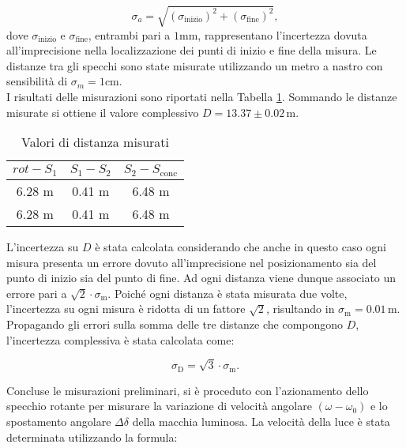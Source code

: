 \documentclass{article}
\begin{document}
\begin{equation}
\sigma_\text{\(a\)} = \sqrt{(\sigma_{\text{inizio}})^2 + (\sigma_{\text{fine}})^2},
\end{equation}
dove \(\sigma_{\text{inizio}}\) e \(\sigma_{\text{fine}}\), entrambi pari a \(1 \text{mm}\), rappresentano l'incertezza dovuta all'imprecisione nella localizzazione dei punti di inizio e fine della misura.
Le distanze tra gli specchi sono state misurate utilizzando un metro a nastro con sensibilità di \(\sigma_m=1\text{cm}\). \\
I risultati delle misurazioni sono riportati nella Tabella \ref{tab:table1}. 
Sommando le distanze misurate si ottiene il valore complessivo \(D = 13.37 \pm 0.02 \, \text{m}\).

\begin{table}[h]
    \centering
    \begin{tabular}{|c|c|c|}
        \hline
        \textbf{\(rot-S_1\)} & \textbf{\(S_1-S_2\)} & \textbf{\(S_2-S_\text{conc}\)} \\ \hline
        6.28 m        & 0.41 m          & 6.48   m              \\ \hline
        6.28  m         & 0.41 m          & 6.48  m      \\ \hline
    \end{tabular}
    \caption{Valori di distanza misurati}
    \label{tab:table1}
\end{table}

L'incertezza su $D$ è stata calcolata considerando che anche in questo caso ogni misura presenta un errore dovuto all'imprecisione nel posizionamento sia del punto di inizio sia del punto di fine.  Ad ogni distanza viene dunque associato un errore pari a \(\sqrt{2}\cdot\sigma_\text{m}\). Poiché ogni distanza è stata misurata due volte, l'incertezza su ogni misura è ridotta di un fattore $\sqrt{2}$, risultando in \(\sigma_\text{m} = 0.01 \, \text{m}\). Propagando gli errori sulla somma delle tre distanze che compongono $D$, l'incertezza complessiva è stata calcolata come:

\begin{equation}
\sigma_\text{D} = \sqrt{3}  \cdot \sigma_\text{m}.
\end{equation}

Concluse le misurazioni preliminari, si è proceduto con l'azionamento dello specchio rotante per misurare la variazione di velocità angolare $(\omega - \omega_0)$ e lo spostamento angolare $\Delta \delta$ della macchia luminosa. La velocità della luce è stata determinata utilizzando la formula:
\end{document}

